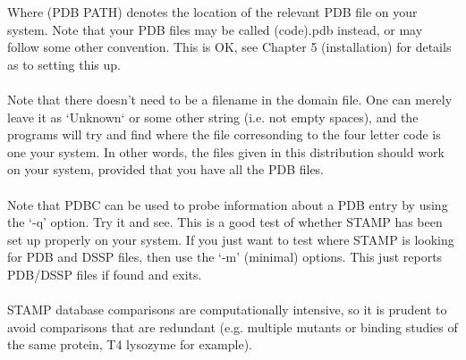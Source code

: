Where (PDB PATH) denotes the location of the relevant PDB file on your 
system.   Note that your PDB files may be called (code).pdb instead, or
may follow some other convention.  This is OK, see Chapter 5 (installation) for
details as to setting this up.\\
\\
Note that there doesn't need to be a filename in the domain file.  One 
can merely leave it as `Unknown` or some other string (i.e. not empty 
spaces), and the programs will try and find where the file corresonding 
to the four letter code is one your system.  In other words, the files 
given in this distribution should work on your system, provided that
you have all the PDB files.\\
\\
Note that PDBC can be used to probe information about a PDB entry by
using the `-q' option.  Try it and see.   This is a good test of whether 
STAMP has been set up properly on your system.  If you just want to test
where STAMP is looking for PDB and DSSP files, then use the `-m' (minimal)
options.  This just reports PDB/DSSP files if found and exits.\\
\\
STAMP database comparisons are computationally intensive, so it is prudent
to avoid comparisons that are redundant (e.g. multiple mutants or binding studies
of the same protein, T4 lysozyme for example).\\


